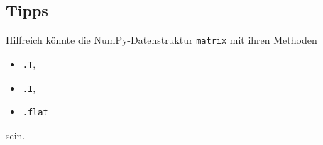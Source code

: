 \documentclass{scrartcl}
\begin{document}
\subsection*{Tipps}

Hilfreich könnte die NumPy-Datenstruktur \texttt{matrix} mit ihren Methoden
\begin{itemize}
    \item \texttt{.T},
    \item \texttt{.I},
    \item \texttt{.flat}
\end{itemize}
sein.
\end{document}
